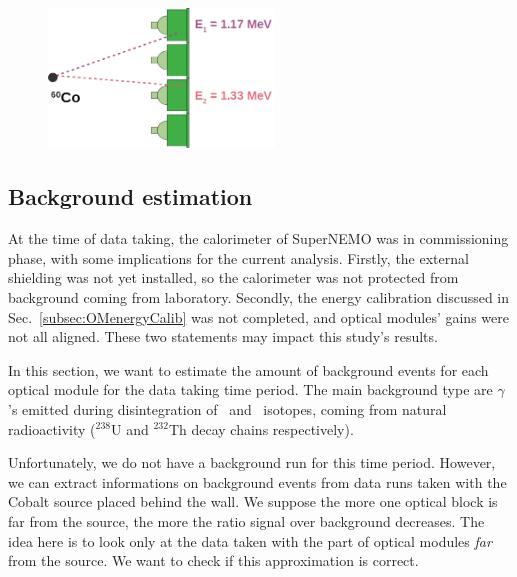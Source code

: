 \begin{figure}[h]
  \centering
  \includegraphics[width=6cm]{commissioning/fig_commissioning/Co_setup.pdf}
  \caption{
\label{fig:}}
\end{figure}


\subsection{Background estimation}
\label{subsec:bkg_estimation}

At the time of data taking, the calorimeter of SuperNEMO was in commissioning phase, with some implications for the current analysis.
Firstly, the external shielding was not yet installed, so the calorimeter was not protected from background coming from laboratory.
Secondly, the energy calibration discussed in Sec.~\ref{subsec:OMenergyCalib} was not completed, and optical modules' gains were not all aligned.
These two statements may impact this study's results.

In this section, we want to estimate the amount of background events for each optical module for the data taking time period.
The main background type are $\gamma$'s emitted during disintegration of \Tl\ and \Bi\ isotopes, coming from natural radioactivity ($^{238}$U and $^{232}$Th decay chains respectively).

Unfortunately, we do not have a background run for this time period.
However, we can extract informations on background events from data runs taken with the Cobalt source placed behind the wall.
We suppose the more one optical block is far from the source, the more the ratio signal over background decreases.
The idea here is to look only at the data taken with the part of optical modules \emph{far} from the source.
We want to check if this approximation is correct.

